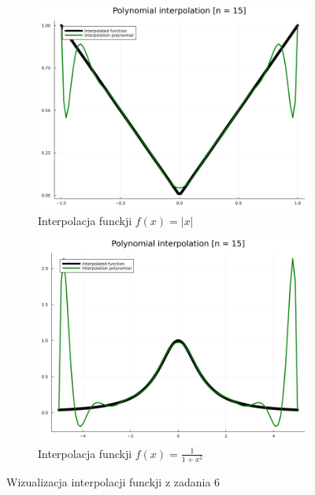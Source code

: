 \documentclass[11pt]{article}
\begin{document}
\begin{figure}[htbp]
\begin{subfigure}[b]{0.45\textwidth}
                \includegraphics[width=\linewidth]{img/ex6_f1_n15.png}
                \caption{Interpolacja funckji $f(x) = |x|$}
            \end{subfigure}
            \hfill
            \begin{subfigure}[b]{0.45\textwidth}
                \includegraphics[width=\linewidth]{img/ex6_f2_n15.png}
                \caption{Interpolacja funckji $f(x) = \frac{1}{1 + x^2}$}
            \end{subfigure}
            \caption{Wizualizacja interpolacji funckji z zadania 6}
        \end{figure}
\end{document}

